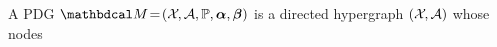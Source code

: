 \documentclass{article}
\newcommand\vjoe[1]{{\color{joecolor}\textbf{$\boldsymbol\{$Joe: }#1 \textbf{$\boldsymbol\}$}}}
\newcommand\voli[1]{{\color{olicolor}\textbf{$\boldsymbol\{$Oli: }#1 \textbf{$\boldsymbol\}$}}}
\begin{document}
\begin{defn}
    A PDG $\dg M \!=\! (\X\mskip-2mu, \Ar,
        \mathbb P, 
        \balpha, \bbeta )
    $
    is     
    a directed hypergraph 
    $(\mathcal X\mskip-2mu, \mathcal A)$ 
    whose nodes 

\end{defn}
\end{document}
